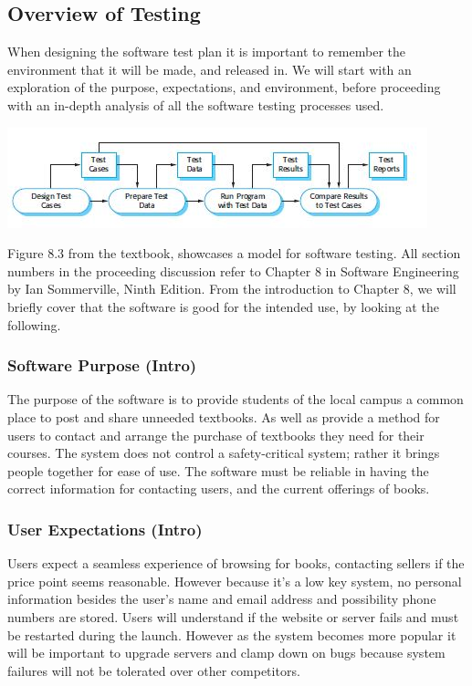 \documentclass[11pt]{article}
\begin{document}
	\subsection{Overview of Testing}
		When designing the software test plan it is important to remember the environment that it will be made, and released in.
		We will start with an exploration of the purpose, expectations, and environment, before proceeding with an in-depth analysis of all the software testing processes used. \\
		\centerline{\includegraphics[scale=0.75]{./images/testProcesses.JPG}} 
		Figure 8.3 from the textbook, showcases a model for software testing.
		All section numbers in the proceeding discussion refer to Chapter 8 in Software Engineering by Ian Sommerville, Ninth Edition.
		From the introduction to Chapter 8, we will briefly cover that the software is good for the intended use, by looking at the following.
		\subsubsection{Software Purpose (Intro)}
			The purpose of the software is to provide students of the local campus a common place to post and share unneeded textbooks.
			As well as provide a method for users to contact and arrange the purchase of textbooks they need for their courses. 
			The system does not control a safety-critical system; rather it brings people together for ease of use. 
			The software must be reliable in having the correct information for contacting users, and the current offerings of books.
		\subsubsection{User Expectations (Intro)}
			Users expect a seamless experience of browsing for books, contacting sellers if the price point seems reasonable.
			However because it's a low key system, no personal information besides the user's name and email address and possibility phone numbers are stored.
			Users will understand if the website or server fails and must be restarted during the launch.
			However as the system becomes more popular it will be important to upgrade servers and clamp down on bugs because system failures will not be tolerated over other competitors.
\end{document}
